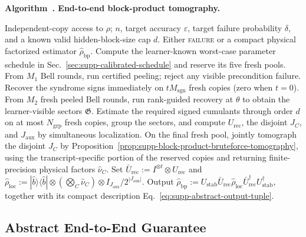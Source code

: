 \documentclass[
  aps,
  prx,
  reprint,
  superscriptaddress,
  amsmath,
  amssymb,
  nofootinbib,
  longbibliography
]{revtex4-2}
\newenvironment{inlinealgorithm}[2]{%
  \par\medskip
  \refstepcounter{figure}%
  \label{#1}%
  \noindent\textbf{Algorithm~\thefigure. #2.}%
  \par\smallskip
}{%
  \par\medskip
}
\begin{document}
\begin{inlinealgorithm}{alg:supp-block-product-main-tomography}{End-to-end block-product tomography}
\begin{algorithmic}[1]
\Require Independent-copy access to \(\rho\); \(n\), target accuracy
\(\varepsilon\), target failure probability \(\delta\), and a known valid
hidden-block-size cap \(d\).
\Ensure Either \textsc{failure} or a compact physical factorized estimator
\(\widehat\rho_{\mathrm{bp}}\).
\State Compute the learner-known worst-case parameter schedule in
Sec.~\ref{sec:supp-calibrated-schedule} and reserve its five fresh pools.
\State From $M_1$ Bell rounds, run certified peeling; reject any visible
precondition failure.  Recover the syndrome signs immediately on
$tM_{\mathrm{sgn}}$ fresh copies (zero when $t=0$).
\State From $M_2$ fresh peeled Bell rounds, run rank-guided recovery at
$\theta$ to obtain the learner-visible sectors $\mathfrak G$.
\State Estimate the required signed cumulants through order $d$ on at most
$N_{\mathrm{grp}}$ fresh copies, group the sectors, and compute
$U_{\mathrm{rec}}$, the disjoint $J_C$, and $J_{\mathrm{aux}}$ by
simultaneous localization.
\State On the final fresh pool, jointly tomograph the disjoint $J_C$ by
Proposition~\ref{prop:supp-block-product-bruteforce-tomography}, using the
transcript-specific portion of the reserved copies and returning
finite-precision physical factors $\widehat\nu_C$.
\State Set $\bar U_{\mathrm{rec}}:=I^{\otimes t}\otimes U_{\mathrm{rec}}$
and $\widehat\rho_{\mathrm{loc}}:=|\widehat b\rangle\!\langle\widehat b|
\otimes(\bigotimes_C\widehat\nu_C)\otimes
I_{J_{\mathrm{aux}}}/2^{|J_{\mathrm{aux}}|}$.
\State Output $\widehat\rho_{\mathrm{bp}}
:=
U_{\mathrm{stab}}\bar U_{\mathrm{rec}}
\widehat\rho_{\mathrm{loc}}
\bar U_{\mathrm{rec}}^\dagger U_{\mathrm{stab}}^\dagger$,
together with its compact description
Eq.~\eqref{eq:supp-abstract-output-tuple}.
\end{algorithmic}
\end{inlinealgorithm}

\subsection{Abstract End-to-End Guarantee}
\end{document}
